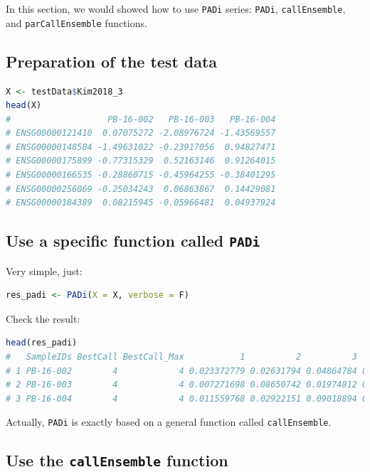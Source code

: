 \documentclass[
  12pt,
]{book}
\newcommand{\passthrough}[1]{#1}
\begin{document}
In this section, we would showed how to use \passthrough{\lstinline!PADi!} series: \passthrough{\lstinline!PADi!}, \passthrough{\lstinline!callEnsemble!}, and \passthrough{\lstinline!parCallEnsemble!} functions.

\hypertarget{preparation-of-the-test-data-1}{%
\subsection{Preparation of the test data}\label{preparation-of-the-test-data-1}}

\begin{lstlisting}[language=R]
X <- testData$Kim2018_3
head(X)
#                   PB-16-002   PB-16-003   PB-16-004
# ENSG00000121410  0.07075272 -2.08976724 -1.43569557
# ENSG00000148584 -1.49631022 -0.23917056  0.94827471
# ENSG00000175899 -0.77315329  0.52163146  0.91264015
# ENSG00000166535 -0.28860715 -0.45964255 -0.38401295
# ENSG00000256069 -0.25034243  0.06863867  0.14429081
# ENSG00000184389  0.08215945 -0.05966481  0.04937924
\end{lstlisting}

\hypertarget{use-a-specific-function-called-padi}{%
\subsection{\texorpdfstring{Use a specific function called \texttt{PADi}}{Use a specific function called PADi}}\label{use-a-specific-function-called-padi}}

Very simple, just:

\begin{lstlisting}[language=R]
res_padi <- PADi(X = X, verbose = F)
\end{lstlisting}

Check the result:

\begin{lstlisting}[language=R]
head(res_padi)
#   SampleIDs BestCall BestCall_Max           1          2          3         4
# 1 PB-16-002        4            4 0.023372779 0.02631794 0.04864784 0.3336484
# 2 PB-16-003        4            4 0.007271698 0.08650742 0.01974812 0.9530730
# 3 PB-16-004        4            4 0.011559768 0.02922151 0.09018894 0.8649045
\end{lstlisting}

Actually, \passthrough{\lstinline!PADi!} is exactly based on a general function called \passthrough{\lstinline!callEnsemble!}.

\hypertarget{use-the-callensemble-function}{%
\subsection{\texorpdfstring{Use the \texttt{callEnsemble} function}{Use the callEnsemble function}}\label{use-the-callensemble-function}}
\end{document}
